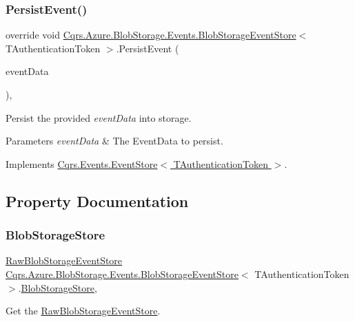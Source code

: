 \subsubsection{\texorpdfstring{Persist\+Event()}{PersistEvent()}}
{\footnotesize\ttfamily override void \hyperlink{classCqrs_1_1Azure_1_1BlobStorage_1_1Events_1_1BlobStorageEventStore}{Cqrs.\+Azure.\+Blob\+Storage.\+Events.\+Blob\+Storage\+Event\+Store}$<$ T\+Authentication\+Token $>$.Persist\+Event (\begin{DoxyParamCaption}\item[{\hyperlink{classCqrs_1_1Events_1_1EventData}{Event\+Data}}]{event\+Data }\end{DoxyParamCaption})\hspace{0.3cm}{\ttfamily [protected]}, {\ttfamily [virtual]}}



Persist the provided {\itshape event\+Data}  into storage. 


\begin{DoxyParams}{Parameters}
{\em event\+Data} & The Event\+Data to persist.\\
\hline
\end{DoxyParams}


Implements \hyperlink{classCqrs_1_1Events_1_1EventStore_aedb71ca0ddf21220e323bc60ad7508cd_aedb71ca0ddf21220e323bc60ad7508cd}{Cqrs.\+Events.\+Event\+Store$<$ T\+Authentication\+Token $>$}.



\subsection{Property Documentation}
\mbox{\label{classCqrs_1_1Azure_1_1BlobStorage_1_1Events_1_1BlobStorageEventStore_a85b9d71c130e5748886a61d80447116d_a85b9d71c130e5748886a61d80447116d}} 
\subsubsection{\texorpdfstring{Blob\+Storage\+Store}{BlobStorageStore}}
{\footnotesize\ttfamily \hyperlink{classCqrs_1_1Azure_1_1BlobStorage_1_1Events_1_1BlobStorageEventStore_1_1RawBlobStorageEventStore}{Raw\+Blob\+Storage\+Event\+Store} \hyperlink{classCqrs_1_1Azure_1_1BlobStorage_1_1Events_1_1BlobStorageEventStore}{Cqrs.\+Azure.\+Blob\+Storage.\+Events.\+Blob\+Storage\+Event\+Store}$<$ T\+Authentication\+Token $>$.\hyperlink{classCqrs_1_1Azure_1_1BlobStorage_1_1BlobStorageStore}{Blob\+Storage\+Store}\hspace{0.3cm}{\ttfamily [get]}, {\ttfamily [protected]}}



Get the \hyperlink{classCqrs_1_1Azure_1_1BlobStorage_1_1Events_1_1BlobStorageEventStore_1_1RawBlobStorageEventStore}{Raw\+Blob\+Storage\+Event\+Store}. 

